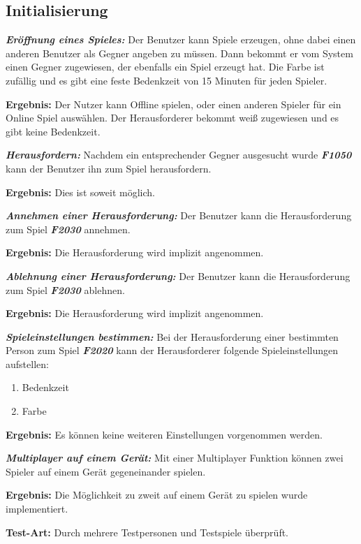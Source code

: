 \documentclass[parskip=full]{scrartcl}
\begin{document}
\subsection{Initialisierung}
\begin{description}
	\hypertarget{F2010}{\item[F2010]}\textbf{\textit{Eröffnung eines Spieles: }} Der Benutzer kann Spiele erzeugen, ohne dabei einen anderen Benutzer als Gegner angeben zu müssen. Dann bekommt er vom System einen Gegner zugewiesen, der ebenfalls ein Spiel erzeugt hat. Die Farbe ist zufällig und es gibt eine feste Bedenkzeit von 15 Minuten für jeden Spieler.
	\item \textbf{Ergebnis: } Der Nutzer kann Offline spielen, oder einen anderen Spieler für ein Online Spiel auswählen. Der Herausforderer bekommt weiß zugewiesen und es gibt keine Bedenkzeit.
	
	\item[F2020] \textbf{\textit{Herausfordern: }} Nachdem ein entsprechender Gegner ausgesucht wurde \textbf{\textit{F1050}} kann der Benutzer ihn zum Spiel herausfordern.
	\item \textbf{Ergebnis: } Dies ist soweit möglich.
	
	\item [F2030] \textbf{\textit{Annehmen einer Herausforderung: }} Der Benutzer kann die Herausforderung zum Spiel \textbf{\textit{F2030}} annehmen.
	\item \textbf{Ergebnis: } Die Herausforderung wird implizit angenommen.
	\item [F2040] \textbf{\textit{Ablehnung einer Herausforderung: }} Der Benutzer kann die Herausforderung zum Spiel \textbf{\textit{F2030}} ablehnen.
	\item \textbf{Ergebnis: } Die Herausforderung wird implizit angenommen.
	
	\item[F2050] \textbf{\textit{Spieleinstellungen bestimmen: }} Bei der Herausforderung einer bestimmten Person zum Spiel \textbf{\textit{F2020}} kann der Herausforderer folgende Spieleinstellungen aufstellen:
	\begin{enumerate}
		\item Bedenkzeit
		\item Farbe
	\end{enumerate}
	\item \textbf{Ergebnis: } Es können keine weiteren Einstellungen vorgenommen werden.
	
	\item[F2060] \textbf{\textit{Multiplayer auf einem Gerät: }}  Mit einer Multiplayer Funktion können zwei Spieler auf einem Gerät gegeneinander spielen.
	\item \textbf{Ergebnis: } Die Möglichkeit zu zweit auf einem Gerät zu spielen wurde implementiert.
	\item \textbf{Test-Art: } Durch mehrere Testpersonen und Testspiele überprüft.
	
	
\end{description}
\end{document}
